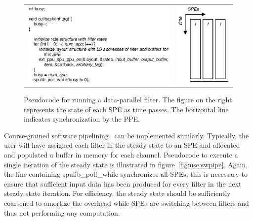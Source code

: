 \begin{figure}[!htb]
\begin{center}
\begin{tabular}{ll}
\includegraphics{figs/dpcode} & \includegraphics{figs/dp}
\end{tabular}
\end{center}
\caption[Pseudocode for running a data-parallel filter.]{Pseudocode for running a data-parallel filter. The figure on the right represents the state of each SPE as time passes. The horizontal line indicates synchronization by the PPE.}
\label{fig:use:dp}
\end{figure}

Course-grained software pipelining~\cite{asplos06} can be implemented similarly. Typically, the user will have assigned each filter in the steady state to an SPE and allocated and populated a buffer in memory for each channel. Pseudocode to execute a single iteration of the steady state is illustrated in figure~\ref{fig:use:swpipe}. Again, the line containing \textsf{spulib\_poll\_while} synchronizes all SPEs; this is necessary to ensure that sufficient input data has been produced for every filter in the next steady state iteration. For efficiency, the steady state should be sufficiently coarsened to amortize the overhead while SPEs are switching between filters and thus not performing any computation.

